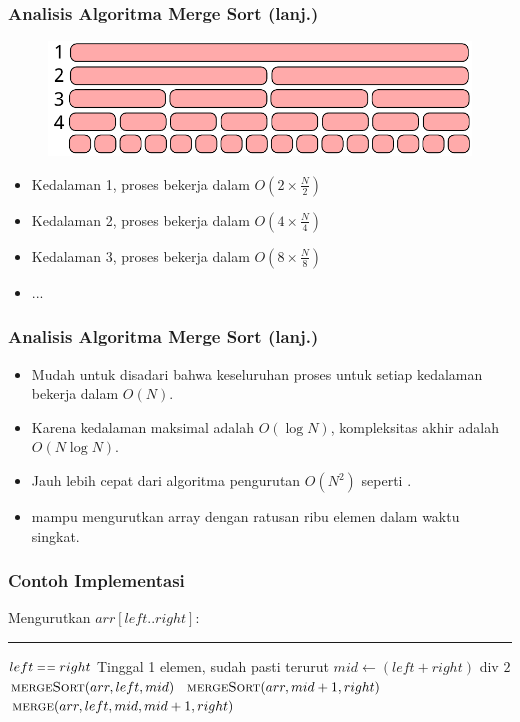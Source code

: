 \begin{frame}
\frametitle{Analisis Algoritma Merge Sort (lanj.)}
\begin{figure}
  \centering
  \includegraphics[width=10 cm]{asset/merge-sort-complexity.pdf}
\end{figure}
\begin{itemize}
  \item Kedalaman 1, proses  bekerja dalam $O(2 \times \frac{N}{2})$
  \item Kedalaman 2, proses  bekerja dalam $O(4 \times \frac{N}{4})$
  \item Kedalaman 3, proses  bekerja dalam $O(8 \times \frac{N}{8})$  
  \item ...  
\end{itemize}
\end{frame}

\begin{frame}
\frametitle{Analisis Algoritma Merge Sort (lanj.)}
\begin{itemize}
  \item Mudah untuk disadari bahwa keseluruhan proses untuk setiap kedalaman bekerja dalam $O(N)$.
  \item Karena kedalaman maksimal adalah $O(\log{N})$, kompleksitas akhir  adalah $O(N \log{N})$.
  \item Jauh lebih cepat dari algoritma pengurutan $O(N^2)$ seperti .
  \item {} mampu mengurutkan array dengan ratusan ribu elemen dalam waktu singkat.
\end{itemize}
\end{frame}


\begin{frame}
\frametitle{Contoh Implementasi}
Mengurutkan $arr[left..right]$:
\noindent\rule{10cm}{0.4pt}
\begin{codebox}
\li \If $left \isequal right$ \Then
\li   \Comment Tinggal 1 elemen, sudah pasti terurut
\li \Else 
\li   $mid \gets (left + right)$ div $2$
\li   $\textnormal{\scshape mergeSort}(arr, left, mid)$
\li   $\textnormal{\scshape mergeSort}(arr, mid+1, right)$
\li   $\textnormal{\scshape merge}(arr, left, mid, mid+1, right)$
    \End
\end{codebox}
\end{frame}

